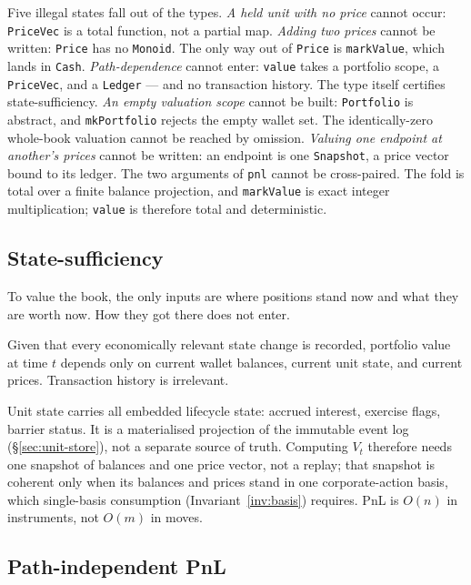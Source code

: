 \noindent Five illegal states fall out of the types. \emph{A held unit with no price} cannot occur: \texttt{PriceVec} is a total function, not a partial map. \emph{Adding two prices} cannot be written: \texttt{Price} has no \texttt{Monoid}. The only way out of \texttt{Price} is \texttt{markValue}, which lands in \texttt{Cash}. \emph{Path-dependence} cannot enter: \texttt{value} takes a portfolio scope, a \texttt{PriceVec}, and a \texttt{Ledger} --- and no transaction history. The type itself certifies state-sufficiency. \emph{An empty valuation scope} cannot be built: \texttt{Portfolio} is abstract, and \texttt{mkPortfolio} rejects the empty wallet set. The identically-zero whole-book valuation cannot be reached by omission. \emph{Valuing one endpoint at another's prices} cannot be written: an endpoint is one \texttt{Snapshot}, a price vector bound to its ledger. The two arguments of \texttt{pnl} cannot be cross-paired. The fold is total over a finite balance projection, and \texttt{markValue} is exact integer multiplication; \texttt{value} is therefore total and deterministic.

\subsection{State-sufficiency}

\noindent To value the book, the only inputs are where positions stand now and what they are worth now. How they got there does not enter.

\begin{principle}
\label{prin:state-sufficiency}
Given that every economically relevant state change is recorded, portfolio value at time $t$ depends only on current wallet balances, current unit state, and current prices. Transaction history is irrelevant.
\end{principle}

\noindent Unit state carries all embedded lifecycle state: accrued interest, exercise flags, barrier status. It is a materialised projection of the immutable event log (\S\ref{sec:unit-store}), not a separate source of truth. Computing $V_t$ therefore needs one snapshot of balances and one price vector, not a replay; that snapshot is coherent only when its balances and prices stand in one corporate-action basis, which single-basis consumption (Invariant~\ref{inv:basis}) requires. PnL is $O(n)$ in instruments, not $O(m)$ in moves.

\subsection{Path-independent PnL}

